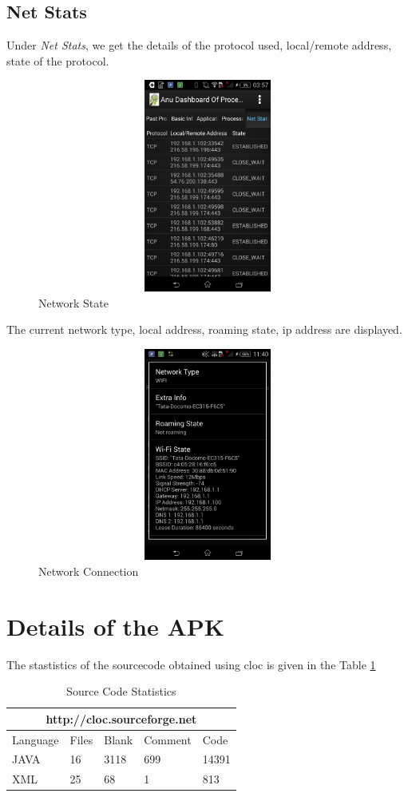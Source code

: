 \documentclass[12pt]{report}
\begin{document}
\subsection{Net Stats}
Under \textit{Net Stats}, we get the details of the protocol used, local/remote address, state of the protocol.
\begin{figure}[H]
	\centering
	\includegraphics[width=1.0\textwidth,width=5cm,height=7cm]{network_details}
	\caption{Network State}
\end{figure}
The current network type, local address, roaming state, ip address are displayed.
\begin{figure}[H]
	\centering
	\includegraphics[width=1.0\textwidth,width=5cm,height=7cm]{nw_connection_details}
	\caption{Network Connection}
\end{figure}


\section{Details of the APK}

The stastistics of the sourcecode obtained using cloc is given in the Table \ref{source-code}

\begin{table}[H]
	\centering
	\caption{Source Code Statistics}
	\label{source-code}
	\begin{tabular}{lllll}
		\hline
		\multicolumn{5}{c}{http://cloc.sourceforge.net} \\ \hline
		Language  & Files  & Blank  & Comment  & Code   \\ \hline
		JAVA      & 16     & 3118   & 699      & 14391  \\ \hline
		XML       & 25     & 68     & 1        & 813    \\ \hline
	\end{tabular}
\end{table}
\end{document}
